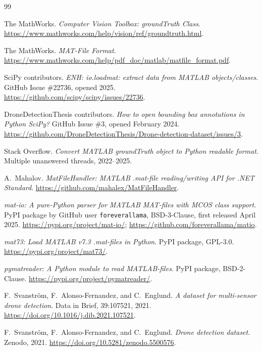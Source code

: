 \documentclass{article}
\begin{document}

\begin{thebibliography}{99}

The MathWorks. \emph{Computer Vision Toolbox: groundTruth Class}.
\url{https://www.mathworks.com/help/vision/ref/groundtruth.html}.

The MathWorks. \emph{MAT-File Format}.
\url{https://www.mathworks.com/help/pdf_doc/matlab/matfile_format.pdf}.

SciPy contributors. \emph{ENH: io.loadmat: extract data from MATLAB
objects/classes}. GitHub Issue \#22736, opened 2025.
\url{https://github.com/scipy/scipy/issues/22736}.

DroneDetectionThesis contributors. \emph{How to open bounding box
annotations in Python SciPy?} GitHub Issue \#3, opened February 2024.
\url{https://github.com/DroneDetectionThesis/Drone-detection-dataset/issues/3}.

Stack Overflow. \emph{Convert MATLAB groundTruth object to Python
readable format}. Multiple unanswered threads, 2022--2025.

A.~Mahalov. \emph{MatFileHandler: MATLAB .mat-file reading/writing API
for .NET Standard}.
\url{https://github.com/mahalex/MatFileHandler}.

\emph{mat-io: A pure-Python parser for MATLAB MAT-files with MCOS
class support}. PyPI package by GitHub user \texttt{foreverallama},
BSD-3-Clause, first released April 2025.
\url{https://pypi.org/project/mat-io/};
\url{https://github.com/foreverallama/matio}.

\emph{mat73: Load MATLAB v7.3 .mat-files in Python}.
PyPI package, GPL-3.0.
\url{https://pypi.org/project/mat73/}.

\emph{pymatreader: A Python module to read MATLAB-files}.
PyPI package, BSD-2-Clause.
\url{https://pypi.org/project/pymatreader/}.

F.~Svanstr\"om, F.~Alonso-Fernandez, and C.~Englund.
\emph{A dataset for multi-sensor drone detection}.
Data in Brief, 39:107521, 2021.
\url{https://doi.org/10.1016/j.dib.2021.107521}.

F.~Svanstr\"om, F.~Alonso-Fernandez, and C.~Englund.
\emph{Drone detection dataset}. Zenodo, 2021.
\url{https://doi.org/10.5281/zenodo.5500576}.

\end{thebibliography}
\end{document}
